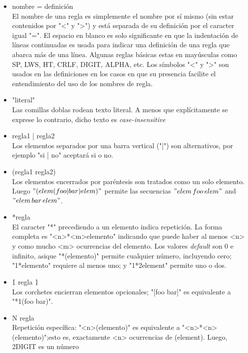 \documentclass[a4paper,10pt]{article}
\begin{document}
        \begin{itemize}
            \item nombre = definici\'on\\
                El nombre de una regla es simplemente el nombre por s\'i mismo (sin estar contenidos por "<" y ">") y está separada de su definici\'on por el caracter igual "=".
                El espacio en blanco es solo significante en que la indentaci\'on de l\'ineas continuadas es usada para indicar una definici\'on de una regla que abarca m\'as 
                de una l\'inea. Algunas reglas b\'asicas estas en may\'usculas como SP, LWS, HT, CRLF, DIGIT, ALPHA, etc. Los s\'imbolos "<" y ">" son usados en las definiciones en los casos
                en que su presencia facilite el entendimiento del uso de los nombres de regla.
            \item "literal" \\
                Las comillas doblas rodean texto literal. A menos que expl\'icitamente se exprese lo contrario, dicho texto es \textit{case-insensitive}
            \item regla1 | regla2\\
                Los elementos separados por una barra vertical ("|") son alternativos, por ejemplo "si | no" aceptar\'a si o no.
            \item (regla1 regla2)\\
                Los elementos encerrados por par\'entesis son tratados como un solo elemento. Luego $"(elem (foo | bar) elem)"$ permite las secuencias 
                $"elem\,foo\,elem"$ and $"elem\,bar\,elem"$.
            \item *regla\\
                El caracter "*" precediendo a un elemento indica repetici\'on. La forma completa es  "<n>*<m>elemento" indicando que puede haber al menos <n> y como mucho <m>
                ocurrencias del elemento. Los valores \textit{default} son $0$ e infinito, asique "*(elemento)" permite cualquier n\'umero, incluyendo cero; "1*elemento" 
                requiere al menos uno; y "1*2element" permite uno o dos.
            \item \verb+[+ regla \verb+]+\\
                Los corchetes encierran elementos opcionales; "[foo bar]" es equivalente a "*1(foo bar)".
            \item N regla\\
                Repetici\'on espec\'ifica: "<n>(elemento)" es equivalente a "<n>*<n>(elemento)";esto es, exactamente <n> ocurrencias de (element). Luego, 2DIGIT es un n\'umero 

\end{itemize}
\end{document}

